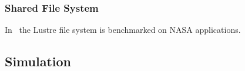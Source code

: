 \documentclass{IEEEtran}
\begin{document}

\subsubsection{Shared File System}








In~\cite{saini2012performance} the Lustre file system is benchmarked on NASA applications. 

\subsection{Simulation} %


\end{document}
